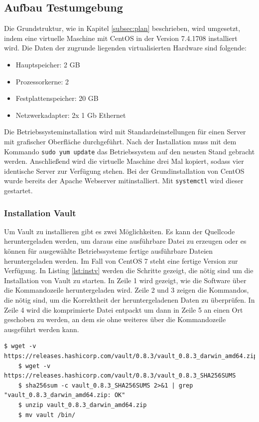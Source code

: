 \documentclass[
book,
a4paper,   
titlepage,  
halfparskip,
12pt        
]{scrartcl}
\newcommand\inline{\lstinline[basicstyle=\ttfamily]}
\begin{document}
\begin{onehalfspacing}
\subsection{Aufbau Testumgebung}
Die Grundstruktur, wie in Kapitel \vref{subsec:plan} beschrieben, wird umgesetzt, indem eine virtuelle Maschine mit CentOS in der Version 7.4.1708 installiert wird. Die Daten der zugrunde liegenden virtualisierten Hardware sind folgende:
\begin{itemize}
	\item Hauptspeicher: 2 GB
	\item Prozessorkerne: 2
	\item Festplattenspeicher: 20 GB
	\item Netzwerkadapter: 2x 1 Gb Ethernet
\end{itemize} 
Die Betriebssysteminstallation wird mit Standardeinstellungen für einen Server mit grafischer Oberfläche durchgeführt. Nach der Installation muss mit dem Kommando \inline|sudo yum update| das Betriebssystem auf den neusten Stand gebracht werden. Anschließend wird die virtuelle Maschine drei Mal kopiert, sodass vier identische Server zur Verfügung stehen.\newline
Bei der Grundinstallation von CentOS wurde bereits der Apache Webserver mitinstalliert. Mit \inline|systemctl| wird dieser gestartet.
\subsubsection{Installation Vault}
\label{subsubsec:instv}
Um Vault zu installieren gibt es zwei Möglichkeiten. Es kann der Quellcode heruntergeladen werden, um daraus eine ausführbare Datei zu erzeugen oder es können für ausgewählte Betriebssysteme fertige ausführbare Dateien heruntergeladen werden. Im Fall von CentOS 7 steht eine fertige Version zur Verfügung. In Listing \vref{lst:instv} werden die Schritte gezeigt, die nötig sind um die Installation von Vault zu starten. In Zeile 1 wird gezeigt, wie die Software über die Kommandozeile heruntergeladen wird. Zeile 2 und 3 zeigen die Kommandos, die nötig sind, um die Korrektheit der heruntergeladenen Daten zu überprüfen. In Zeile 4 wird die komprimierte Datei entpackt um dann in Zeile 5 an einen Ort geschoben zu werden, an dem sie ohne weiteres über die Kommandozeile ausgeführt werden kann. 

\begin{lstlisting}[caption={[Installation Vault] Schritte die zur Installation von Vault notwendig sind}, label=lst:instv, captionpos=b, basicstyle=\ttfamily]
	$ wget -v https://releases.hashicorp.com/vault/0.8.3/vault_0.8.3_darwin_amd64.zip
	$ wget -v https://releases.hashicorp.com/vault/0.8.3/vault_0.8.3_SHA256SUMS
	$ sha256sum -c vault_0.8.3_SHA256SUMS 2>&1 | grep "vault_0.8.3_darwin_amd64.zip: OK"
	$ unzip vault_0.8.3_darwin_amd64.zip
	$ mv vault /bin/
\end{lstlisting}


\end{onehalfspacing}
\end{document}
